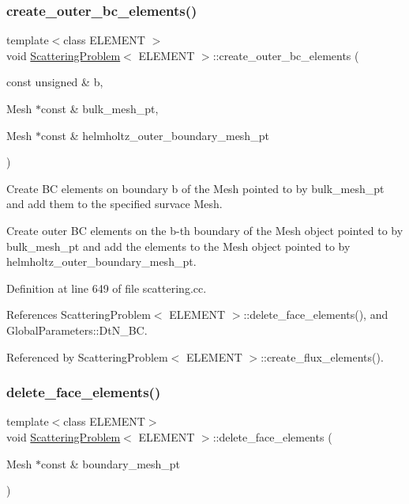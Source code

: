 \subsubsection{\texorpdfstring{create\+\_\+outer\+\_\+bc\+\_\+elements()}{create\_outer\_bc\_elements()}\hspace{0.1cm}{\footnotesize\ttfamily [2/2]}}
{\footnotesize\ttfamily template$<$class E\+L\+E\+M\+E\+NT $>$ \\
void \hyperlink{classScatteringProblem}{Scattering\+Problem}$<$ E\+L\+E\+M\+E\+NT $>$\+::create\+\_\+outer\+\_\+bc\+\_\+elements (\begin{DoxyParamCaption}\item[{const unsigned \&}]{b,  }\item[{Mesh $\ast$const \&}]{bulk\+\_\+mesh\+\_\+pt,  }\item[{Mesh $\ast$const \&}]{helmholtz\+\_\+outer\+\_\+boundary\+\_\+mesh\+\_\+pt }\end{DoxyParamCaption})}



Create BC elements on boundary b of the Mesh pointed to by bulk\+\_\+mesh\+\_\+pt and add them to the specified survace Mesh. 

Create outer BC elements on the b-\/th boundary of the Mesh object pointed to by bulk\+\_\+mesh\+\_\+pt and add the elements to the Mesh object pointed to by helmholtz\+\_\+outer\+\_\+boundary\+\_\+mesh\+\_\+pt. 

Definition at line 649 of file scattering.\+cc.



References Scattering\+Problem$<$ E\+L\+E\+M\+E\+N\+T $>$\+::delete\+\_\+face\+\_\+elements(), and Global\+Parameters\+::\+Dt\+N\+\_\+\+BC.



Referenced by Scattering\+Problem$<$ E\+L\+E\+M\+E\+N\+T $>$\+::create\+\_\+flux\+\_\+elements().

\mbox{\label{classScatteringProblem_aaef8a78e317333ddadd0be6a500c1134}} 
\subsubsection{\texorpdfstring{delete\+\_\+face\+\_\+elements()}{delete\_face\_elements()}\hspace{0.1cm}{\footnotesize\ttfamily [1/2]}}
{\footnotesize\ttfamily template$<$class E\+L\+E\+M\+E\+NT$>$ \\
void \hyperlink{classScatteringProblem}{Scattering\+Problem}$<$ E\+L\+E\+M\+E\+NT $>$\+::delete\+\_\+face\+\_\+elements (\begin{DoxyParamCaption}\item[{Mesh $\ast$const \&}]{boundary\+\_\+mesh\+\_\+pt }\end{DoxyParamCaption})}



